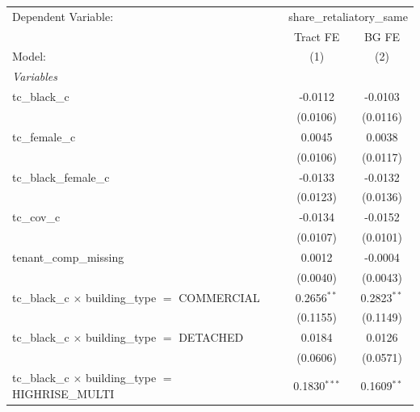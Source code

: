 \begin{tabular}{lcc}
   \tabularnewline \midrule \midrule
   Dependent Variable: & \multicolumn{2}{c}{share\_retaliatory\_same}\\
                                                                       & Tract FE       & BG FE \\   
   Model:                                                              & (1)            & (2)\\  
   \midrule
   \emph{Variables}\\
   tc\_black\_c                                                        & -0.0112        & -0.0103\\   
                                                                       & (0.0106)       & (0.0116)\\   
   tc\_female\_c                                                       & 0.0045         & 0.0038\\   
                                                                       & (0.0106)       & (0.0117)\\   
   tc\_black\_female\_c                                                & -0.0133        & -0.0132\\   
                                                                       & (0.0123)       & (0.0136)\\   
   tc\_cov\_c                                                          & -0.0134        & -0.0152\\   
                                                                       & (0.0107)       & (0.0101)\\   
   tenant\_comp\_missing                                               & 0.0012         & -0.0004\\   
                                                                       & (0.0040)       & (0.0043)\\   
   tc\_black\_c $\times$ building\_type $=$ COMMERCIAL                 & 0.2656$^{**}$  & 0.2823$^{**}$\\   
                                                                       & (0.1155)       & (0.1149)\\   
   tc\_black\_c $\times$ building\_type $=$ DETACHED                   & 0.0184         & 0.0126\\   
                                                                       & (0.0606)       & (0.0571)\\   
   tc\_black\_c $\times$ building\_type $=$ HIGHRISE\_MULTI            & 0.1830$^{***}$ & 0.1609$^{**}$\\   

\end{tabular}
